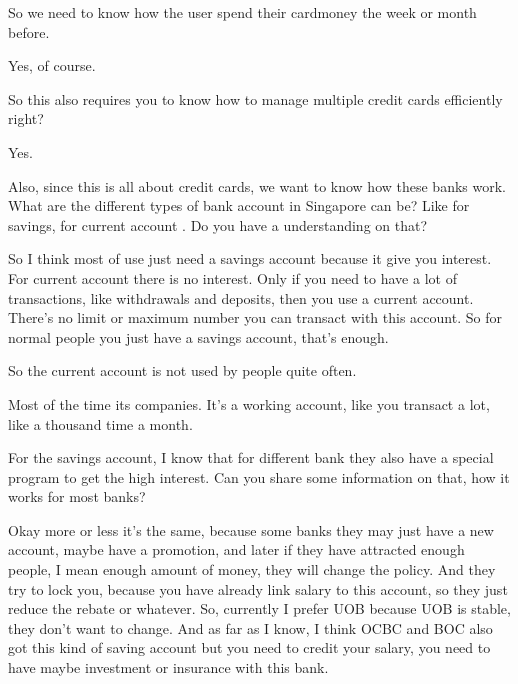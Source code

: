 \begin{description}[leftmargin=4em,style=nextline]
	\item[JH:] So we need to know how the user spend their card\/money the week or month before.

	\item[HJ:] Yes, of course.

	\item[JH:] So this also requires you to know how to manage multiple credit cards efficiently right?

	\item[HJ:] Yes.

	\item[JH:] Also, since this is all about credit cards, we want to know how these banks work. What are the different types of bank account in Singapore can be? Like for savings, for current account . Do you have a understanding on that?

	\item[HJ:] So I think most of use just need a savings account because it give you interest. For current account there is no interest. Only if you need to have a lot of transactions, like withdrawals and deposits, then you use a current account. There’s no limit or maximum number you can transact with this account. So for normal people you just have a savings account, that’s enough.

	\item[JH:] So the current account is not used by people quite often.

	\item[HJ:] Most of the time its companies. It’s a working account, like you transact a lot, like a thousand time a month.

	\item[JH:] For the savings account, I know that for different bank they also have a special program to get the high interest. Can you share some information on that, how it works for most banks?

	\item[HJ:] Okay more or less it’s the same, because some banks they may just have a new account, maybe have a promotion, and later if they have attracted enough people, I mean enough amount of money, they will change the policy. And they try to lock you, because you have already link salary to this account, so they just reduce the rebate or whatever. So, currently I prefer UOB because UOB is stable, they don’t want to change. And as far as I know, I think OCBC and BOC also got this kind of saving account but you need to credit your salary, you need to have maybe investment or insurance with this bank.


\end{description}
